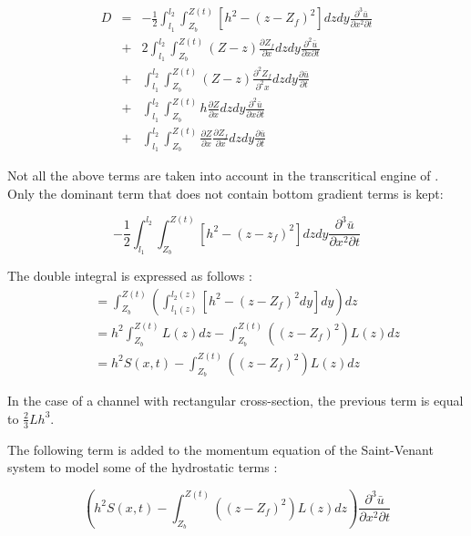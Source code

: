 \begin{eqnarray}
  D & = & -\frac{1}{2}\int_{l_{1}}^{l_{2}}\int_{Z_{b}}^{Z(t)}\left[{h}^2-{(z-Z_f)}^2\right]dzdy\frac{\partial^3{\bar{u}}}{\partial{{x}^2}\partial{t}} \\
    & + & 2\int_{l_{1}}^{l_{2}}\int_{Z_{b}}^{Z(t)}(Z-z)\frac{\partial{Z_f}}{\partial{x}}dzdy\frac{\partial^2{\bar{u}}}{\partial{x}\partial{t}} \nonumber \\
    & + & \int_{l_{1}}^{l_{2}}\int_{Z_{b}}^{Z(t)}(Z-z)\frac{\partial^2{Z_f}}{\partial^2{x}}dzdy\frac{\partial{\bar{u}}}{\partial{t}}\nonumber \\ & + & \int_{l_{1}}^{l_{2}}\int_{Z_{b}}^{Z(t)}h\frac{\partial{Z}}{\partial{x}}dzdy\frac{\partial^2{\bar{u}}}{\partial{x}\partial{t}}\nonumber \\
& + & \int_{l_{1}}^{l_{2}}\int_{Z_{b}}^{Z(t)}\frac{\partial{Z}}{\partial{x}}\frac{\partial{Z_f}}{\partial{x}}dzdy\frac{\partial{\bar{u}}}{\partial{t}} \nonumber
\end{eqnarray}

Not all the above terms are taken into account in the transcritical engine of \mascaret{}. Only the dominant term that does not contain bottom gradient terms is kept:

\begin{equation}
-\frac{1}{2}\int_{l_{1}}^{l_{2}}\int_{Z_{b}}^{Z(t)}\left[{h}^2-{(z-z_f)}^2\right]dzdy\frac{\partial^3{\bar{u}}}{\partial{{x}^2}\partial{t}}
\end{equation}

The double integral is expressed as follows :
\begin{eqnarray}
&&=\int_{Z_{b}}^{Z(t)}\left(\int_{l_{1}(z)}^{l_{2}(z)}\left[h^2-(z-Z_f)^2dy\right]dy\right)dz\\
&&=h^2\int_{Z_{b}}^{Z(t)}L(z)dz-\int_{Z_{b}}^{Z(t)}\left((z-Z_f)^2\right)L(z)dz\\
&&=h^2S(x,t)-\int_{Z_{b}}^{Z(t)}\left((z-Z_f)^2\right)L(z)dz
\end{eqnarray}

In the case of a channel with rectangular cross-section, the previous term is equal to $\frac{2}{3}Lh^3$.

The following term is added to the momentum equation of the Saint-Venant system to model some of the hydrostatic terms :

\begin{equation}
  \left(h^2S(x,t)-\int_{Z_{b}}^{Z(t)}\left((z-Z_f)^2\right)L(z)dz\right)\frac{\partial^3{\bar{u}}}{\partial{{x}^2}\partial{t}}
\end{equation}

